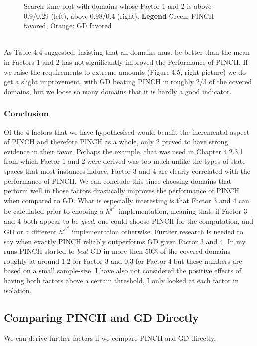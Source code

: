 \begin{figure}[h]
\begin{minipage}[b]{0.40\textwidth}
    \caption{Search time plot with domains whose Factor 1 and 2 is above 0.9/0.29 (left), above 0.98/0.4 (right). \textbf{Legend} Green: PINCH favored, Orange: GD favored}
  \end{minipage}
\end{figure}\\
As Table 4.4 suggested, insisting that all domains must be better than the mean in Factors 1 and 2 has not significantly improved the Performance of PINCH. If we raise the requirements to extreme amounts (Figure 4.5, right picture) we do get a slight improvement, with GD beating PINCH in roughly 2/3 of the covered domains, but we loose so many domains that it is hardly a good indicator.
\subsubsection{Conclusion}
Of the 4 factors that we have hypothesised would benefit the incremental aspect of PINCH and therefore PINCH as a whole, only 2 proved to have strong evidence in their favor. Perhaps the example, that was used in Chapter 4.2.3.1 from which Factor 1 and 2 were derived was too much unlike the types of state spaces that most instances induce. Factor 3 and 4 are clearly correlated with the performance of PINCH. We can conclude this since choosing domains that perform well in those factors drastically improves the performance of PINCH when compared to GD. What is especially interesting is that Factor 3 and 4 can be calculated prior to choosing a $h^a^d^d$ implementation, meaning that, if Factor 3 and 4 both appear to be \textit{good}, one could choose PINCH for the computation, and GD or a different $h^a^d^d$ implementation otherwise. Further research is needed to say when exactly PINCH reliably outperforms GD given Factor 3 and 4. In my runs PINCH started to \textit{beat} GD in more then 50\% of the covered domains roughly at around 1.2 for Factor 3 and 0.3 for Factor 4 but these numbers are based on a small sample-size. I have also not considered the positive effects of having both factors above a certain threshold, I only looked at each factor in isolation.
\newpage
\subsection{Comparing PINCH and GD Directly}
We can derive further factors if we compare PINCH and GD directly. 
